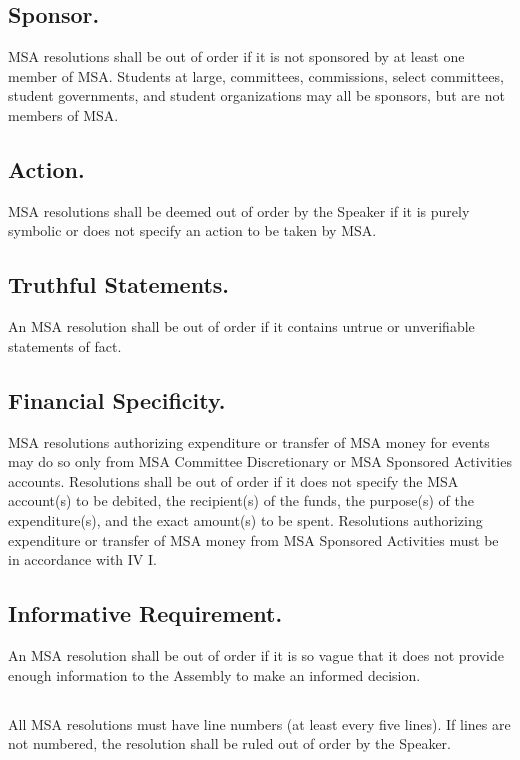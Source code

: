 \documentclass{rules}
\begin{document}
\subsection{Sponsor.}
MSA resolutions shall be out of order if it is not sponsored by at least one member of MSA.  Students at large, committees, commissions, select committees, student governments, and student organizations may all be sponsors, but are not members of MSA.
\subsection{Action.}
MSA resolutions shall be deemed out of order by the Speaker if it is purely symbolic or does not specify an action to be taken by MSA.
\subsection{Truthful Statements.}
An MSA resolution shall be out of order if it contains untrue or unverifiable statements of fact.
\subsection{Financial Specificity.}
MSA resolutions authorizing expenditure or transfer of MSA money for events may do so only from MSA Committee Discretionary or MSA Sponsored Activities accounts.  Resolutions shall be out of order if it does not specify the MSA account(s) to be debited, the recipient(s) of the funds, the purpose(s) of the expenditure(s), and the exact amount(s) to be spent. Resolutions authorizing expenditure or transfer of MSA money from MSA Sponsored Activities must be in accordance with IV I.
\subsection{Informative Requirement.}
An MSA resolution shall be out of order if it is so vague that it does not provide enough information to the Assembly to make an informed decision.
\subsection{}
All MSA resolutions must have line numbers (at least every five lines).  If lines are not numbered, the resolution shall be ruled out of order by the Speaker.
\end{document}
